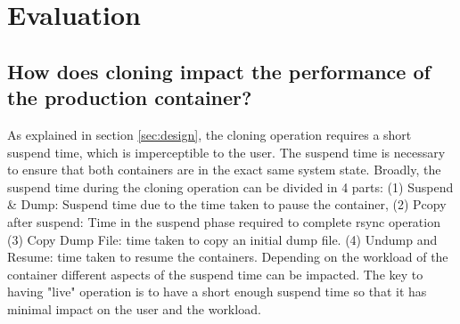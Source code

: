 \section{Evaluation}
\label{sec:evaluation}

\subsection{How does cloning impact the performance of the production container?}
\label{sec:performance}
As explained in section \ref{sec:design}, the cloning operation requires a short suspend time, which is imperceptible to the user.
The suspend time is necessary to ensure that both containers are in the exact same system state.
Broadly, the suspend time during the cloning operation can be divided in 4 parts: 
(1) Suspend \& Dump: Suspend time due to the time taken to pause the container, 
(2) Pcopy after suspend: Time in the suspend phase required to complete rsync operation 
(3) Copy Dump File: time taken to copy an initial dump file.
(4) Undump and Resume: time taken to resume the containers. 
Depending on the workload of the container different aspects of the suspend time can be impacted.
The key to having "live" operation is to have a short enough suspend time so that it has minimal impact on the user and the workload.


